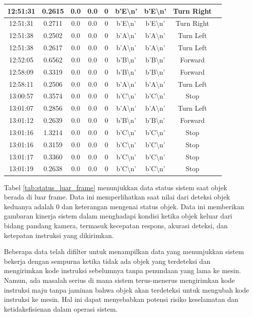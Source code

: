\begin{table}[H]
\begin{tabular}{|c|c|c|c|c|c|c|c|c|}
    12:51:31 & 0.2615 & 0.0 & 0.0 & 0 & b'E\textbackslash n' & b'E\textbackslash n' & Turn Right \\ \hline
    12:51:31 & 0.2711 & 0.0 & 0.0 & 0 & b'E\textbackslash n' & b'E\textbackslash n' & Turn Right \\ \hline
    12:51:38 & 0.2502 & 0.0 & 0.0 & 0 & b'A\textbackslash n' & b'A\textbackslash n' & Turn Left \\ \hline
    12:51:38 & 0.2617 & 0.0 & 0.0 & 0 & b'A\textbackslash n' & b'A\textbackslash n' & Turn Left \\ \hline
    12:52:05 & 0.6562 & 0.0 & 0.0 & 0 & b'B\textbackslash n' & b'B\textbackslash n' & Forward \\ \hline
    12:58:09 & 0.3319 & 0.0 & 0.0 & 0 & b'B\textbackslash n' & b'B\textbackslash n' & Forward \\ \hline
    12:58:11 & 0.2506 & 0.0 & 0.0 & 0 & b'A\textbackslash n' & b'A\textbackslash n' & Turn Left \\ \hline
    13:00:57 & 0.3574 & 0.0 & 0.0 & 0 & b'C\textbackslash n' & b'C\textbackslash n' & Stop \\ \hline
    13:01:07 & 0.2856 & 0.0 & 0.0 & 0 & b'A\textbackslash n' & b'A\textbackslash n' & Turn Left \\ \hline
    13:01:12 & 0.2639 & 0.0 & 0.0 & 0 & b'B\textbackslash n' & b'B\textbackslash n' & Forward \\ \hline
    13:01:16 & 1.3214 & 0.0 & 0.0 & 0 & b'C\textbackslash n' & b'C\textbackslash n' & Stop \\ \hline
    13:01:16 & 0.3159 & 0.0 & 0.0 & 0 & b'C\textbackslash n' & b'C\textbackslash n' & Stop \\ \hline
    13:01:17 & 0.3360 & 0.0 & 0.0 & 0 & b'C\textbackslash n' & b'C\textbackslash n' & Stop \\ \hline
    13:01:19 & 0.2638 & 0.0 & 0.0 & 0 & b'C\textbackslash n' & b'C\textbackslash n' & Stop \\ \hline
    \end{tabular}
\end{table}
Tabel \ref{tab:status_luar_frame} menunjukkan data status sistem saat objek berada di luar frame. Data ini memperlihatkan saat nilai dari deteksi objek keduanya adalah 0 dan keterangan mengenai status objek. Data ini memberikan gambaran kinerja sistem dalam menghadapi kondisi ketika objek keluar dari bidang pandang kamera, termasuk kecepatan respons, akurasi deteksi, dan ketepatan instruksi yang dikirimkan.

Beberapa data telah difilter untuk menampilkan data yang menunjukkan sistem bekerja dengan sempurna ketika tidak ada objek yang terdeteksi dan mengirimkan kode instruksi sebelumnya tanpa penundaan yang lama ke mesin. Namun, ada masalah serius di mana sistem terus-menerus mengirimkan kode instruksi maju tanpa jaminan bahwa objek akan terdeteksi untuk mengubah kode instruksi ke mesin. Hal ini dapat menyebabkan potensi risiko keselamatan dan ketidakefisienan dalam operasi sistem.

